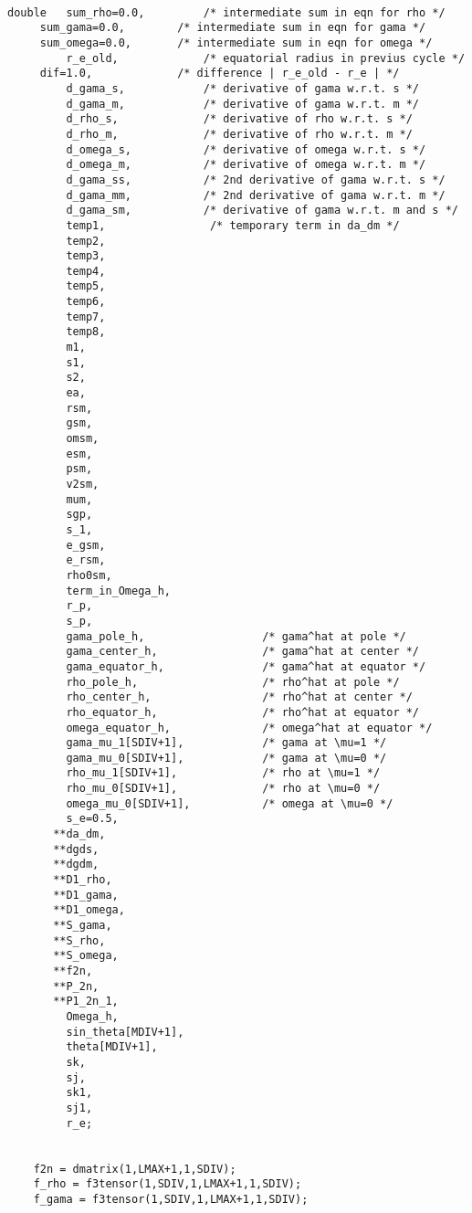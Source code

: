 \begin{verbatim}
 
double   sum_rho=0.0,         /* intermediate sum in eqn for rho */
	 sum_gama=0.0,        /* intermediate sum in eqn for gama */
	 sum_omega=0.0,       /* intermediate sum in eqn for omega */
         r_e_old,             /* equatorial radius in previus cycle */
   	 dif=1.0,             /* difference | r_e_old - r_e | */
         d_gama_s,            /* derivative of gama w.r.t. s */
         d_gama_m,            /* derivative of gama w.r.t. m */
         d_rho_s,             /* derivative of rho w.r.t. s */
         d_rho_m,             /* derivative of rho w.r.t. m */
         d_omega_s,           /* derivative of omega w.r.t. s */
         d_omega_m,           /* derivative of omega w.r.t. m */
         d_gama_ss,           /* 2nd derivative of gama w.r.t. s */
         d_gama_mm,           /* 2nd derivative of gama w.r.t. m */
         d_gama_sm,           /* derivative of gama w.r.t. m and s */
         temp1,                /* temporary term in da_dm */ 
         temp2, 
         temp3,
         temp4,
         temp5,
         temp6,
         temp7,
         temp8,
         m1,                  
         s1,
         s2,
         ea,
         rsm,
         gsm,
         omsm,
         esm,
         psm,
         v2sm,
         mum,
         sgp,
         s_1,
         e_gsm,
         e_rsm, 
         rho0sm,
         term_in_Omega_h,
         r_p,
         s_p,
         gama_pole_h,                  /* gama^hat at pole */  
         gama_center_h,                /* gama^hat at center */
         gama_equator_h,               /* gama^hat at equator */
         rho_pole_h,                   /* rho^hat at pole */ 
         rho_center_h,                 /* rho^hat at center */
         rho_equator_h,                /* rho^hat at equator */ 
         omega_equator_h,              /* omega^hat at equator */         
         gama_mu_1[SDIV+1],            /* gama at \mu=1 */
         gama_mu_0[SDIV+1],            /* gama at \mu=0 */
         rho_mu_1[SDIV+1],             /* rho at \mu=1 */
         rho_mu_0[SDIV+1],             /* rho at \mu=0 */
         omega_mu_0[SDIV+1],           /* omega at \mu=0 */
         s_e=0.5,
       **da_dm,
       **dgds,
       **dgdm,
       **D1_rho,
       **D1_gama,
       **D1_omega,
       **S_gama,
       **S_rho,
       **S_omega,
       **f2n,
       **P_2n,   
       **P1_2n_1,
         Omega_h,
         sin_theta[MDIV+1],
         theta[MDIV+1],
         sk,
         sj,
         sk1,
         sj1,
         r_e;
 

    f2n = dmatrix(1,LMAX+1,1,SDIV);
    f_rho = f3tensor(1,SDIV,1,LMAX+1,1,SDIV);
    f_gama = f3tensor(1,SDIV,1,LMAX+1,1,SDIV);
 

\end{verbatim}
